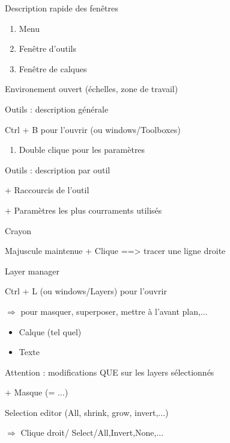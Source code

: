 \documentclass[10pt,svgnames,usenames,table]{beamer}
\begin{document}
\begin{frame}
	Description rapide des fenêtres 
	\begin{enumerate}
	\item Menu
	\item Fenêtre d'outils 
	\item Fenêtre de calques 
	
	\end{enumerate}
	Environement ouvert (échelles, zone de travail)
\end{frame}

\begin{frame}
	Outils : description générale
	
	Ctrl + B pour l'ouvrir (ou windows/Toolboxes)
	
	\begin{enumerate}
	\item Double clique pour les paramètres
	\end{enumerate} 
\end{frame}

\begin{frame}
	Outils : description par outil
	
	+ Raccourcis de l'outil
	
	+ Paramètres les plus courraments utilisés
\end{frame}

\begin{frame}
	Crayon
	
	Majuscule maintenue + Clique ==> tracer une ligne droite 
\end{frame}

\begin{frame}
	Layer manager 
	
	Ctrl + L (ou windows/Layers) pour l'ouvrir
	
	$\Rightarrow$ pour masquer, superposer, mettre à l'avant plan,... 
	 
	\begin{itemize}
		\item Calque (tel quel)
		\item Texte 
	\end{itemize}
	
	Attention : modifications QUE sur les layers sélectionnés 
	
	+ Masque (= ...) 
\end{frame}

\begin{frame}
	Selection editor (All, shrink, grow, invert,...)
	
	$\Rightarrow$ Clique droit/	Select/All,Invert,None,...
\end{frame}
\end{document}
